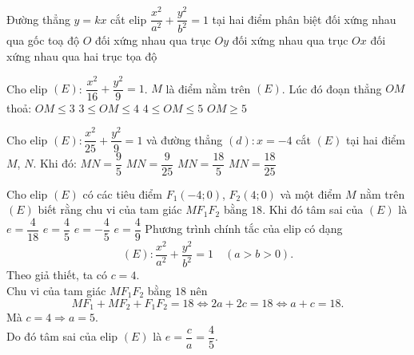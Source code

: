 \begin{ex}%
	Đường thẳng $y = kx$ cắt elip $\dfrac{x^2}{a^2}+\dfrac{y^2}{b^2}=1$ tại hai điểm phân biệt
	\choice
	{\True đối xứng nhau qua gốc toạ độ $O$}
	{đối xứng nhau qua trục $Oy$}
	{đối xứng nhau qua trục $Ox$}
	{đối xứng nhau qua hai trục tọa độ}
\end{ex}

\begin{ex}%
	Cho elip $(E)$: $\dfrac{x^2}{16}+\dfrac{y^2}{9}=1$. $M$ là điểm nằm trên $(E)$. Lúc đó đoạn thẳng $OM$ thoả:
	\choice
	{$OM \leq 3$}
	{\True $3 \leq OM \leq 4$}
	{$4 \leq OM \leq 5$}
	{$OM \geq 5$}
\end{ex}

\begin{ex}%
	Cho elip $(E):\dfrac{x^2}{25}+\dfrac{y^2}9=1$ và đường thẳng $(d): x=-4$ cắt $(E)$ tại hai điểm $M$, $N$. Khi đó:
	\choice
	{$MN=\dfrac{9}{5}$}
	{$MN=\dfrac{9}{25}$}
	{\True $MN=\dfrac{18}{5}$}
	{$MN=\dfrac{18}{25}$}
\end{ex}

\begin{ex}%
	Cho elip $(E)$ có các tiêu điểm $F_1(-4;0)$, $F_2(4;0)$ và một điểm $M$ nằm trên $(E)$ biết rằng chu vi của tam giác $MF_1F_2$ bằng $18$. Khi đó tâm sai của $(E)$ là
	\choice
	{$e = \dfrac{4}{18}$}
	{\True $e = \dfrac{4}{5}$}
	{$e = -\dfrac{4}{5}$}
	{$e = \dfrac{4}{9}$}
	\loigiai
	{
		Phương trình chính tắc của elip có dạng 
		$$ (E)\colon \dfrac{x^2}{a^2} + \dfrac{y^2}{b^2} = 1 \quad (a > b >0). $$
		Theo giả thiết, ta có $c = 4$.\\
		Chu vi của tam giác $MF_1F_2$ bằng $18$ nên
		$$ MF_1 + MF_2 + F_1F_2 = 18 \Leftrightarrow 2a + 2c = 18 \Leftrightarrow a + c = 18. $$
		Mà $c = 4 \Rightarrow a = 5$.\\
		Do đó tâm sai của elip $(E)$ là $e = \dfrac{c}{a} = \dfrac{4}{5}$.
	}
\end{ex}

